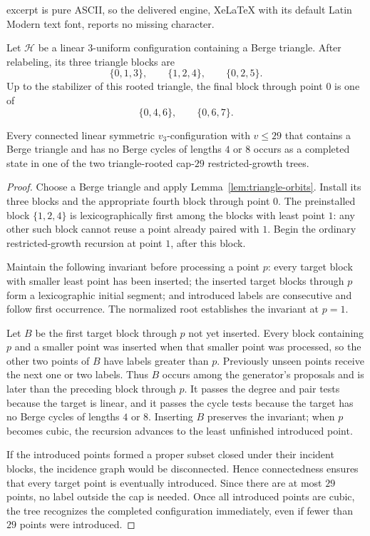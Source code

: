 \documentclass[10pt,a4paper]{amsart}
\newcommand{\cH}{\mathcal{H}}
\begin{document}
excerpt is pure ASCII, so the delivered engine, XeLaTeX with its default Latin Modern text font, reports no missing character.
\begin{lemma}\label{lem:triangle-orbits}
Let \(\cH\) be a linear \(3\)-uniform configuration containing a Berge
triangle. After relabeling, its three triangle blocks are
\[
  \{0,1,3\},\qquad \{1,2,4\},\qquad \{0,2,5\}.
\]
Up to the stabilizer of this rooted triangle, the final block through point
\(0\) is one of
\[
  \{0,4,6\},\qquad \{0,6,7\}.
\]
\end{lemma}

\begin{proposition}\label{prop:triangle-coverage}
Every connected linear symmetric \(v_3\)-configuration with \(v\leq29\)
that contains a Berge triangle and has no Berge cycles of lengths \(4\) or
\(8\) occurs as a completed state in one of the two triangle-rooted
cap-\(29\) restricted-growth trees.
\end{proposition}

\begin{proof}
Choose a Berge triangle and apply Lemma~\ref{lem:triangle-orbits}. Install
its three blocks and the appropriate fourth block through point \(0\).
The preinstalled block \(\{1,2,4\}\) is lexicographically first among the
blocks with least point \(1\): any other such block cannot reuse a point
already paired with \(1\). Begin the ordinary restricted-growth recursion at
point \(1\), after this block.

Maintain the following invariant before processing a point \(p\): every
target block with smaller least point has been inserted; the inserted target
blocks through \(p\) form a lexicographic initial segment; and introduced
labels are consecutive and follow first occurrence. The normalized root
establishes the invariant at \(p=1\).

Let \(B\) be the first target block through \(p\) not yet inserted. Every
block containing \(p\) and a smaller point was inserted when that smaller
point was processed, so the other two points of \(B\) have labels greater
than \(p\). Previously unseen points receive the next one or two labels.
Thus \(B\) occurs among the generator's proposals and is later than the
preceding block through \(p\). It passes the degree and pair tests because
the target is linear, and it passes the cycle tests because the target has no
Berge cycles of lengths \(4\) or \(8\). Inserting \(B\) preserves the
invariant; when \(p\) becomes cubic, the recursion advances to the least
unfinished introduced point.

If the introduced points formed a proper subset closed under their incident
blocks, the incidence graph would be disconnected. Hence connectedness
ensures that every target point is eventually introduced. Since there are at
most \(29\) points, no label outside the cap is needed. Once all introduced
points are cubic, the tree recognizes the completed configuration
immediately, even if fewer than \(29\) points were introduced.
\end{proof}
\end{document}
